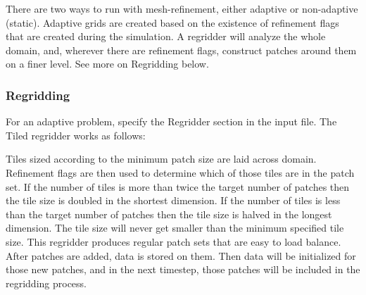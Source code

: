 There are two ways to run with mesh-refinement, either adaptive or
non-adaptive (static). Adaptive grids are created based on the
existence of refinement flags that are created during the
simulation. A regridder will analyze the whole domain, and, wherever there are
refinement flags, construct patches around them on a finer
level. See more on Regridding below.

\subsubsection{Regridding}


For an adaptive problem, specify the Regridder section in the input
file. The Tiled regridder works as follows:
 





Tiles sized according to the minimum patch size are laid across domain. Refinement flags are then used to determine which of
those tiles are in the patch set. If the number of tiles is more than
twice the target number of patches then the tile size is doubled in
the shortest dimension. If the number of tiles is less than the target
number of patches then the tile size is halved in the longest
dimension. The tile size will never get smaller than the minimum
specified tile size. This regridder produces regular patch sets that
are easy to load balance. After patches are added, data is stored on them. Then data will be
initialized for those new patches, and in the next timestep, those
patches will be included in the regridding process.

